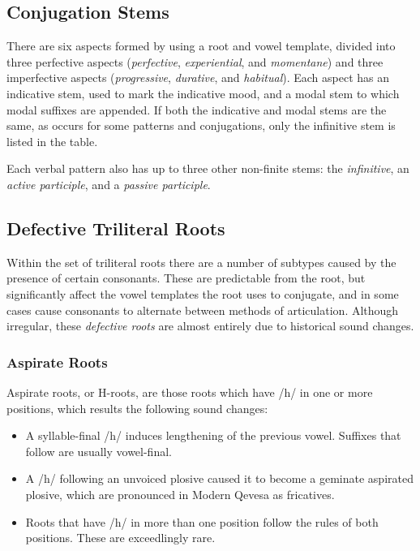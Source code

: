 \documentclass[grammar]{subfiles}
\begin{document}
\subsection{Conjugation Stems}
\label{sssec:vm_conjugation}

There are six aspects formed by using a root and vowel template, divided into
three perfective aspects (\emph{perfective}, \emph{experiential}, and
\emph{momentane}) and three imperfective aspects (\emph{progressive},
\emph{durative}, and \emph{habitual}).  Each aspect has an indicative stem,
used to mark the indicative mood, and a modal stem to which modal suffixes are
appended.  If both the indicative and modal stems are the same, as occurs for
some patterns and conjugations, only the infinitive stem is listed in the
table. 

Each verbal pattern also has up to three other non-finite stems: the
\emph{infinitive}, an \emph{active participle}, and a \emph{passive participle}.  


\subsection{Defective Triliteral Roots}
\label{ssec:vm_defective_roots}

Within the set of triliteral roots there are a number of subtypes caused by
the presence of certain consonants.  These are predictable from the root, but
significantly affect the vowel templates the root uses to conjugate, and in
some cases cause consonants to alternate between methods of articulation.
Although irregular, these \emph{defective roots} are almost entirely due to
historical sound changes. 


\subsubsection{Aspirate Roots}
\label{sssec:vm_aspirate_roots}

Aspirate roots, or H-roots, are those roots which have /h/ in one or more positions, which
results the following sound changes:

\begin{itemize}
  \item A syllable-final /h/ induces lengthening of the previous vowel.  Suffixes
    that follow are usually vowel-final.
  \item A /h/ following an unvoiced plosive caused it to become a geminate
    aspirated plosive, which are pronounced in Modern Qevesa as fricatives.
  \item Roots that have /h/ in more than one position follow the rules of both
    positions.  These are exceedlingly rare.
\end{itemize}
\end{document}
